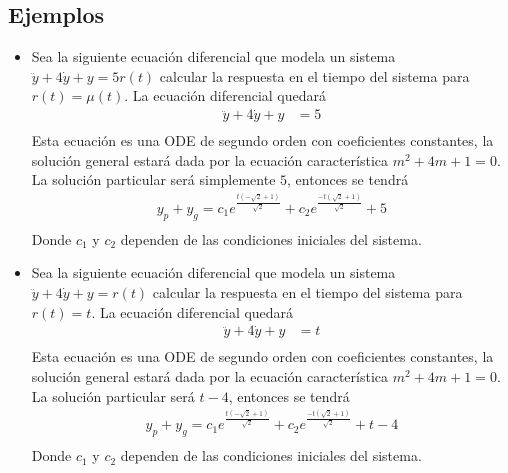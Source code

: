 \documentclass[12pt]{article}
\begin{document}
\subsection{Ejemplos}
\begin{itemize}
    \item Sea la siguiente ecuación diferencial que modela un sistema $\ddot{y}+4\dot{y}+y=5r(t)$ calcular la respuesta en el tiempo del sistema para $r(t)=\mu(t)$.
    La ecuación diferencial quedará
    \begin{equation}
        \begin{split}
            \ddot{y}+4\dot{y}+y&=5\\
            \label{eq:ode1}
        \end{split}
    \end{equation}
    Esta ecuación es una ODE de segundo orden con coeficientes constantes, la solución general estará dada por la ecuación característica $m^2+4m+1=0$.
    La solución particular será simplemente $5$, entonces se tendrá
    \begin{equation}
        \begin{split}
            y_{p}+y_{g}=c_{1}e^{\frac{t(-\sqrt{2}+1)}{\sqrt{2}}}+c_{2}e^{\frac{-t(\sqrt{2}+1)}{\sqrt{2}}}+5\\
            \label{eq:ode12}
        \end{split}
    \end{equation}
    Donde $c_{1}$ y $c_{2}$ dependen de las condiciones iniciales del sistema.

    \item Sea la siguiente ecuación diferencial que modela un sistema $\ddot{y}+4\dot{y}+y=r(t)$ calcular la respuesta en el tiempo del sistema para $r(t)=t$.
    La ecuación diferencial quedará
    \begin{equation}
        \begin{split}
            \ddot{y}+4\dot{y}+y&=t\\
            \label{eq:ode2}
        \end{split}
    \end{equation}
    Esta ecuación es una ODE de segundo orden con coeficientes constantes, la solución general estará dada por la ecuación característica $m^2+4m+1=0$.
    La solución particular será $t-4$, entonces se tendrá
    \begin{equation}
        \begin{split}
            y_{p}+y_{g}=c_{1}e^{\frac{t(-\sqrt{2}+1)}{\sqrt{2}}}+c_{2}e^{\frac{-t(\sqrt{2}+1)}{\sqrt{2}}}+t-4\\
            \label{eq:ode21}
        \end{split}
    \end{equation}
    Donde $c_{1}$ y $c_{2}$ dependen de las condiciones iniciales del sistema.


\end{itemize}
\end{document}
